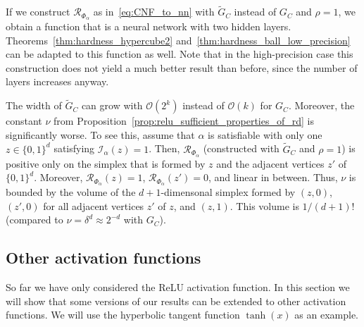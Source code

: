 \documentclass{amsart}[11pt]
\numberwithin{equation}{section}
\newcommand{\realization}{\mathcal{R}}
\newcommand{\interpretation}{\mathcal{I}}
\newcommand{\order}{\mathcal{O}}
\numberwithin{theorem}{section}
\begin{document}
If we construct $\realization_{\Phi_\alpha}$ as in~\eqref{eq:CNF_to_nn} with $\widetilde G_C$ instead of $G_C$ and $\rho=1$, we obtain a function that is a neural network with two hidden layers. Theorems~\ref{thm:hardness_hypercube2} and~\ref{thm:hardness_ball_low_precision} can be adapted to this function as well. Note that in the high-precision case this construction does not yield a much better result than before, since the number of layers increases anyway.

The width of $\widetilde G_C$ can grow with $\order(2^k)$ instead of $\order(k)$ for $G_C$. Moreover, the constant $\nu$ from Proposition~\ref{prop:relu_sufficient_properties_of_rd} is significantly worse. To see this, assume that $\alpha$ is satisfiable with only one $z\in\{0,1\}^d$ satisfying $\interpretation_\alpha(z)=1$. Then, $\realization_{\Phi_\alpha}$ (constructed with $\widetilde G_C$ and $\rho=1$) is positive only on the simplex that is formed by $z$ and the adjacent vertices $z'$ of $\{0,1\}^d$. Moreover, $\realization_{\Phi_\alpha}(z)=1$, $\realization_{\Phi_\alpha}(z')=0$, and linear in between.  Thus, $\nu$ is bounded by the volume of the $d+1$-dimensonal simplex formed by $(z,0)$, $(z',0)$ for all adjacent vertices $z'$ of $z$, and $(z,1)$. This volume is $1/(d+1)!$ (compared to $\nu = \delta^d\approx 2^{-d}$ with $G_C$).
\subsection{Other activation functions}

So far we have only considered the ReLU activation function. In this section we will show that some versions of our results can be extended to other activation functions. We will use the hyperbolic tangent function $\tanh(x)$ as an example.
\end{document}

